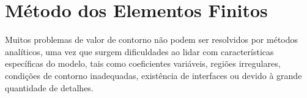 \section{Método dos Elementos Finitos}

Muitos problemas de valor de contorno não podem ser resolvidos por métodos analíticos, uma vez que surgem dificuldades ao lidar com características específicas do modelo, tais como coeficientes variáveis, regiões irregulares, condições de contorno inadequadas, existência de interfaces ou devido à grande quantidade de detalhes.
\citep[p. 410]{powers}